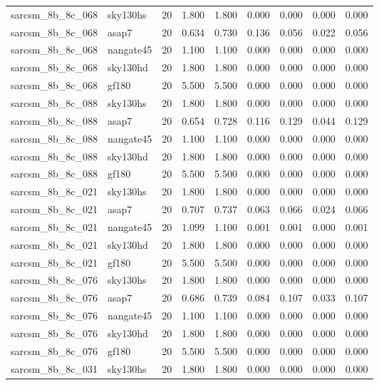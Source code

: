 \begin{tabular}{llrrrrrrr}
sarcsm\_8b\_8c\_068 & sky130hs & 20 & 1.800 & 1.800 & 0.000 & 0.000 & 0.000 & 0.000 \\
sarcsm\_8b\_8c\_068 & asap7 & 20 & 0.634 & 0.730 & 0.136 & 0.056 & 0.022 & 0.056 \\
sarcsm\_8b\_8c\_068 & nangate45 & 20 & 1.100 & 1.100 & 0.000 & 0.000 & 0.000 & 0.000 \\
sarcsm\_8b\_8c\_068 & sky130hd & 20 & 1.800 & 1.800 & 0.000 & 0.000 & 0.000 & 0.000 \\
sarcsm\_8b\_8c\_068 & gf180 & 20 & 5.500 & 5.500 & 0.000 & 0.000 & 0.000 & 0.000 \\
sarcsm\_8b\_8c\_088 & sky130hs & 20 & 1.800 & 1.800 & 0.000 & 0.000 & 0.000 & 0.000 \\
sarcsm\_8b\_8c\_088 & asap7 & 20 & 0.654 & 0.728 & 0.116 & 0.129 & 0.044 & 0.129 \\
sarcsm\_8b\_8c\_088 & nangate45 & 20 & 1.100 & 1.100 & 0.000 & 0.000 & 0.000 & 0.000 \\
sarcsm\_8b\_8c\_088 & sky130hd & 20 & 1.800 & 1.800 & 0.000 & 0.000 & 0.000 & 0.000 \\
sarcsm\_8b\_8c\_088 & gf180 & 20 & 5.500 & 5.500 & 0.000 & 0.000 & 0.000 & 0.000 \\
sarcsm\_8b\_8c\_021 & sky130hs & 20 & 1.800 & 1.800 & 0.000 & 0.000 & 0.000 & 0.000 \\
sarcsm\_8b\_8c\_021 & asap7 & 20 & 0.707 & 0.737 & 0.063 & 0.066 & 0.024 & 0.066 \\
sarcsm\_8b\_8c\_021 & nangate45 & 20 & 1.099 & 1.100 & 0.001 & 0.001 & 0.000 & 0.001 \\
sarcsm\_8b\_8c\_021 & sky130hd & 20 & 1.800 & 1.800 & 0.000 & 0.000 & 0.000 & 0.000 \\
sarcsm\_8b\_8c\_021 & gf180 & 20 & 5.500 & 5.500 & 0.000 & 0.000 & 0.000 & 0.000 \\
sarcsm\_8b\_8c\_076 & sky130hs & 20 & 1.800 & 1.800 & 0.000 & 0.000 & 0.000 & 0.000 \\
sarcsm\_8b\_8c\_076 & asap7 & 20 & 0.686 & 0.739 & 0.084 & 0.107 & 0.033 & 0.107 \\
sarcsm\_8b\_8c\_076 & nangate45 & 20 & 1.100 & 1.100 & 0.000 & 0.000 & 0.000 & 0.000 \\
sarcsm\_8b\_8c\_076 & sky130hd & 20 & 1.800 & 1.800 & 0.000 & 0.000 & 0.000 & 0.000 \\
sarcsm\_8b\_8c\_076 & gf180 & 20 & 5.500 & 5.500 & 0.000 & 0.000 & 0.000 & 0.000 \\
sarcsm\_8b\_8c\_031 & sky130hs & 20 & 1.800 & 1.800 & 0.000 & 0.000 & 0.000 & 0.000 \\

\end{tabular}
